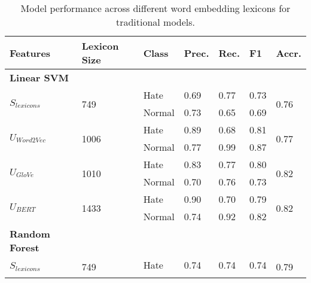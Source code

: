 \begin{table}
\caption{Model performance across different word embedding lexicons for traditional models.}
\label{tab:supervisedPerformance}
\begin{center}
\small
\begin{tabular}{|l|l|lllll|}
\hline
\textbf{Features} & \textbf{Lexicon Size} & \multicolumn{1}{l|}{\textbf{Class}} & \multicolumn{1}{l|}{\textbf{Prec.}} & \multicolumn{1}{l|}{\textbf{Rec.}} & \multicolumn{1}{l|}{\textbf{F1}} & \textbf{Accr.} \\ \hline
\textbf{Linear SVM} &  &  &  &  &  &  \\ \hline
\multirow{2}{*}{$S_{lexicons}$} & \multirow{2}{*}{749} & \multicolumn{1}{l|}{Hate} & \multicolumn{1}{l|}{0.69} & \multicolumn{1}{l|}{0.77} & \multicolumn{1}{l|}{0.73} & \multirow{2}{*}{0.76} \\ \cline{3-6}
 &  & \multicolumn{1}{l|}{Normal} & \multicolumn{1}{l|}{0.73} & \multicolumn{1}{l|}{0.65} & \multicolumn{1}{l|}{0.69} &  \\ \hline
\multirow{2}{*}{$U_{Word2Vec}$} & \multirow{2}{*}{1006} & \multicolumn{1}{l|}{Hate} & \multicolumn{1}{l|}{0.89} & \multicolumn{1}{l|}{0.68} & \multicolumn{1}{l|}{0.81} & \multirow{2}{*}{0.77} \\ \cline{3-6}
 &  & \multicolumn{1}{l|}{Normal} & \multicolumn{1}{l|}{0.77} & \multicolumn{1}{l|}{0.99} & \multicolumn{1}{l|}{0.87} &  \\ \hline
\multirow{2}{*}{$U_{GloVe}$} & \multirow{2}{*}{1010} & \multicolumn{1}{l|}{Hate} & \multicolumn{1}{l|}{0.83} & \multicolumn{1}{l|}{0.77} & \multicolumn{1}{l|}{0.80} & \multirow{2}{*}{0.82} \\ \cline{3-6}
 &  & \multicolumn{1}{l|}{Normal} & \multicolumn{1}{l|}{0.70} & \multicolumn{1}{l|}{0.76} & \multicolumn{1}{l|}{0.73} &  \\ \hline
\multirow{2}{*}{$U_{BERT}$} & \multirow{2}{*}{1433} & \multicolumn{1}{l|}{Hate} & \multicolumn{1}{l|}{0.90} & \multicolumn{1}{l|}{0.70} & \multicolumn{1}{l|}{0.79} & \multirow{2}{*}{0.82} \\ \cline{3-6}
 &  & \multicolumn{1}{l|}{Normal} & \multicolumn{1}{l|}{0.74} & \multicolumn{1}{l|}{0.92} & \multicolumn{1}{l|}{0.82} &  \\ \hline
\textbf{Random Forest} &  &  &  &  &  &  \\ \hline
\multirow{2}{*}{$S_{lexicons}$} & \multirow{2}{*}{749} & \multicolumn{1}{l|}{Hate} & \multicolumn{1}{l|}{0.74} & \multicolumn{1}{l|}{0.74} & \multicolumn{1}{l|}{0.74} & \multirow{2}{*}{0.79} \\ \cline{3-6}

\end{tabular}
\end{center}
\end{table}
